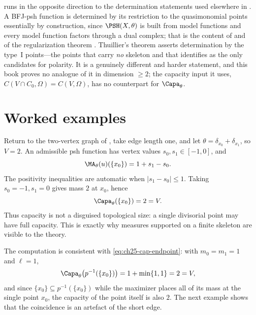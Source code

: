 \begin{remark}
\label{rem:ch25-thuillier-determination}
 runs in the opposite direction to
the determination statements used elsewhere in .  A
BFJ-psh function is determined by its restriction to the quasimonomial
points essentially by construction, since $\PSH(X,\theta)$ is built from
model functions and every model function factors through a dual complex; that
is the content of  and of the
regularization theorem .  Thuillier's
theorem asserts determination by the type~$\mathrm{I}$ points---the points
that carry \emph{no} skeleton and that
 identifies as the only candidates for
polarity.  It is a genuinely different and harder statement, and this book
proves no analogue of it in dimension $\geq2$; the capacity input it uses,
$C(V\cap C_0,\Omega)=C(V,\Omega)$, has no counterpart for
$\Capa_\theta$.
\end{remark}

\section{Worked examples}
\label{sec:ch25-worked}

\begin{example}
\label{ex:ch25-two-vertex-full-capacity}
Return to the two-vertex graph of , take edge
length one, and let
$\theta=\delta_{x_0}+\delta_{x_1}$, so $V=2$. An admissible psh function
has vertex values $s_0,s_1\in[-1,0]$, and
\[
 \MA_\theta(u)(\{x_0\})=1+s_1-s_0.
\]
The positivity inequalities are automatic when $|s_1-s_0|\leq1$. Taking
$s_0=-1,s_1=0$ gives mass $2$ at $x_0$, hence
\[
                 \Capa_\theta(\{x_0\})=2=V.
\]
Thus capacity is not a disguised topological size: a single divisorial point
may have full capacity. This is exactly why measures supported on a finite
skeleton are visible to the theory.
\end{example}

The computation is consistent with
\eqref{eq:ch25-cap-endpoint}: with $m_0=m_1=1$ and $\ell=1$,
\[
 \Capa_\theta\bigl(p^{-1}(\{x_0\})\bigr)=1+\min\{1,1\}=2=V,
\]
and since $\{x_0\}\subseteq p^{-1}(\{x_0\})$ while the maximizer places all
of its mass at the single point $x_0$, the capacity of the point itself is
also $2$.  The next example shows that the coincidence is an artefact of
the short edge.

